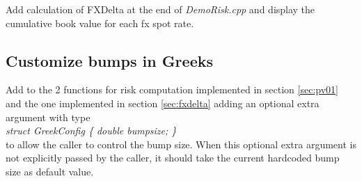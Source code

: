 \documentclass[10pt]{article}
\begin{document}
Add calculation of FXDelta at the end of \textit{DemoRisk.cpp} and display the cumulative book value for each fx spot rate.

\subsection{Customize bumps in Greeks}

Add to the 2 functions for risk computation implemented in section \ref{sec:pv01} and the one implemented in section \ref{sec:fxdelta} adding an optional extra argument with type\\
\textit{struct GreekConfig \{ double bumpsize; \}}\\
to allow the caller to control the bump size. When this optional extra argument is not explicitly passed by the caller, it should take the current hardcoded bump size as default value.
\end{document}
